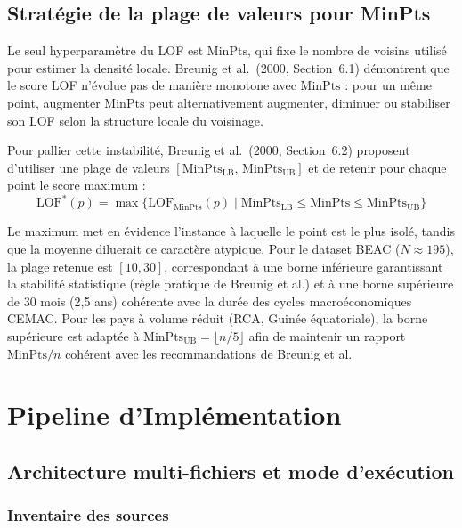 \documentclass[12pt,a4paper]{article}
\begin{document}
\subsection{Stratégie de la plage de valeurs pour MinPts}

Le seul hyperparamètre du LOF est $\mathrm{MinPts}$, qui fixe le nombre de
voisins utilisé pour estimer la densité locale. Breunig et al.\ (2000,
Section~6.1) démontrent que le score LOF n'évolue pas de manière monotone
avec $\mathrm{MinPts}$ : pour un même point, augmenter $\mathrm{MinPts}$
peut alternativement augmenter, diminuer ou stabiliser son LOF selon la
structure locale du voisinage.

Pour pallier cette instabilité, Breunig et al.\ (2000, Section~6.2) proposent
d'utiliser une plage de valeurs $[\mathrm{MinPts}_\mathrm{LB},\,
\mathrm{MinPts}_\mathrm{UB}]$ et de retenir pour chaque point le score
maximum :
$$\mathrm{LOF}^*(p) = \max \bigl\{
\mathrm{LOF}_{\mathrm{MinPts}}(p) \mid
\mathrm{MinPts}_\mathrm{LB} \leq \mathrm{MinPts} \leq
\mathrm{MinPts}_\mathrm{UB}
\bigr\}$$

Le maximum met en évidence l'instance à laquelle le point est le plus isolé,
tandis que la moyenne diluerait ce caractère atypique. Pour le dataset BEAC
($N \approx 195$), la plage retenue est $[10, 30]$, correspondant à une borne
inférieure garantissant la stabilité statistique (règle pratique de Breunig
et al.) et à une borne supérieure de 30 mois (2,5 ans) cohérente avec la durée
des cycles macroéconomiques CEMAC. Pour les pays à volume réduit (RCA, Guinée
équatoriale), la borne supérieure est adaptée à
$\mathrm{MinPts}_\mathrm{UB} = \lfloor n/5 \rfloor$ afin de maintenir
un rapport $\mathrm{MinPts}/n$ cohérent avec les recommandations de Breunig
et al.

\section{Pipeline d'Implémentation}

\subsection{Architecture multi-fichiers et mode d'exécution}

\subsubsection{Inventaire des sources}
\end{document}
